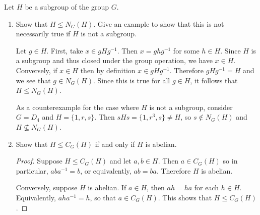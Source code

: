  Let $H$ be a subgroup of the group $G$.
\begin{enumerate}
\item Show that $H\leq N_G(H)$. Give an example to show that this is
  not necessarily true if $H$ is not a subgroup.
  \begin{solution}
    Let $g\in H$. First, take $x\in gHg^{-1}$. Then $x = ghg^{-1}$ for
    some $h\in H$. Since $H$ is a subgroup and thus closed under the
    group operation, we have $x\in H$. Conversely, if $x\in H$ then by
    definition $x\in gHg^{-1}$. Therefore $gHg^{-1} = H$ and we see
    that $g\in N_G(H)$. Since this is true for all $g\in H$, it
    follows that $H\leq N_G(H)$.

    As a counterexample for the case where $H$ is not a subgroup,
    consider $G = D_4$ and $H = \{1, r, s\}$. Then
    $sHs = \{1, r^3, s\} \neq H$, so $s\not\in N_G(H)$ and
    $H\not\subseteq N_G(H)$.
  \end{solution}
\item Show that $H\leq C_G(H)$ if and only if $H$ is abelian.
  \begin{proof}
    Suppose $H\leq C_G(H)$ and let $a,b\in H$. Then $a\in C_G(H)$ so
    in particular, $aba^{-1} = b$, or equivalently, $ab =
    ba$. Therefore $H$ is abelian.

    Conversely, suppose $H$ is abelian. If $a\in H$, then $ah = ha$
    for each $h\in H$. Equivalently, $aha^{-1} = h$, so that
    $a\in C_G(H)$. This shows that $H\leq C_G(H)$.
  \end{proof}
\end{enumerate}

